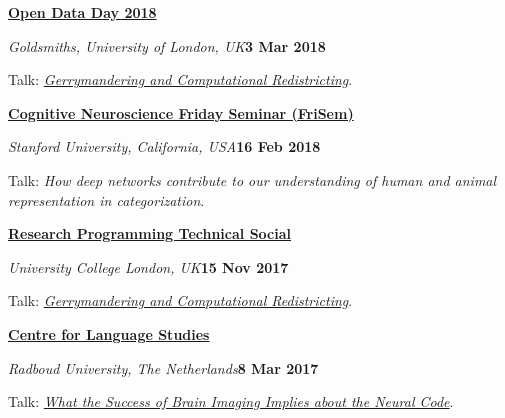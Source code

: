 \documentclass[10pt]{article}
\newenvironment{outerlist}[1][\enskip\textbullet]%
        {\begin{itemize}[#1]}{\end{itemize}%
         \vspace{-.6\baselineskip}}
\newenvironment{innerlist}[1][\enskip\textbullet]%
        {\begin{compactitem}[#1]}{\end{compactitem}}
\begin{document}
\textbf{\href{http://opendataday.org/}{Open Data Day 2018}}
\begin{outerlist}
  \item[] \textit{Goldsmiths, University of London, UK}\hfill\textbf{3 Mar 2018}
  \begin{innerlist}
    \item Talk:  \textit{\href{http://figshare.com/articles/Gerrymandering_and_Computational_Redistricting/5605387}{Gerrymandering and Computational Redistricting}}.
  \end{innerlist}
\end{outerlist}
\vspace{8pt}

\textbf{\href{https://psychology.stanford.edu/events/frisem}{Cognitive Neuroscience Friday Seminar (FriSem)}}
\begin{outerlist}
  \item[] \textit{Stanford University, California, USA}\hfill\textbf{16 Feb 2018}
  \begin{innerlist}
    \item Talk: \textit{How deep networks contribute to our understanding of human and animal representation in categorization}.
  \end{innerlist}
\end{outerlist}
\vspace{8pt}

\textbf{\href{http://www.ucl.ac.uk/research-it-services/research-software-development/programming-hub/tech-socials}{Research Programming Technical Social}}
\begin{outerlist}
  \item[] \textit{University College London, UK}\hfill\textbf{15 Nov 2017}
  \begin{innerlist}
    \item Talk: \textit{\href{https://figshare.com/articles/Gerrymandering_and_Computational_Redistricting/5605387/3}{Gerrymandering and Computational Redistricting}}.
  \end{innerlist}
\end{outerlist}
\vspace{8pt}

\textbf{\href{http://www.ru.nl/cls/}{Centre for Language Studies}}
\begin{outerlist}
  \item[] \textit{Radboud University, The Netherlands}\hfill\textbf{8 Mar 2017}
  \begin{innerlist}
    \item Talk: \textit{\href{https://figshare.com/articles/What_the_Success_of_Brain_Imaging_Implies_about_the_Neural_Code/4252022}{What the Success of Brain Imaging Implies about the Neural Code}}.
  \end{innerlist}
\end{outerlist}
\vspace{8pt}
\end{document}
